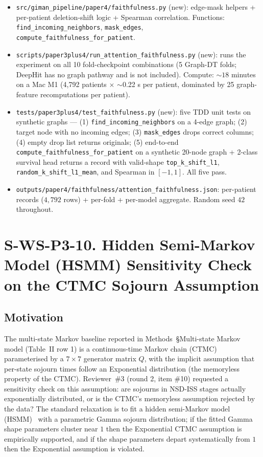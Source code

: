 \documentclass[11pt]{article}
\begin{document}
\begin{itemize}\itemsep=0.2em
  \item \texttt{src/giman\_pipeline/paper4/faithfulness.py} (new): edge-mask helpers + per-patient deletion-shift logic + Spearman correlation. Functions: \texttt{find\_incoming\_neighbors}, \texttt{mask\_edges}, \texttt{compute\_faithfulness\_for\_patient}.
  \item \texttt{scripts/paper3plus4/run\_attention\_faithfulness.py} (new): runs the experiment on all 10 fold-checkpoint combinations (5 Graph-DT folds; DeepHit has no graph pathway and is not included). Compute: $\sim 18$ minutes on a Mac M1 (4{,}792 patients $\times$ $\sim$0.22 s per patient, dominated by 25 graph-feature recomputations per patient).
  \item \texttt{tests/paper3plus4/test\_faithfulness.py} (new): five TDD unit tests on synthetic graphs --- (1) \texttt{find\_incoming\_neighbors} on a 4-edge graph; (2) target node with no incoming edges; (3) \texttt{mask\_edges} drops correct columns; (4) empty drop list returns originals; (5) end-to-end \texttt{compute\_faithfulness\_for\_patient} on a synthetic 20-node graph + 2-class survival head returns a record with valid-shape \texttt{top\_k\_shift\_l1}, \texttt{random\_k\_shift\_l1\_mean}, and Spearman in $[-1, 1]$. All five pass.
  \item \texttt{outputs/paper4/faithfulness/attention\_faithfulness.json}: per-patient records ($4{,}792$ rows) + per-fold + per-model aggregate. Random seed $42$ throughout.
\end{itemize}


\section*{S-WS-P3-10. Hidden Semi-Markov Model (HSMM) Sensitivity Check on the CTMC Sojourn Assumption}

\subsection*{Motivation}

The multi-state Markov baseline reported in Methods~\S Multi-state Markov model (Table~II row 1) is a continuous-time Markov chain (CTMC) parameterised by a $7\times 7$ generator matrix $Q$, with the implicit assumption that per-state sojourn times follow an Exponential distribution (the memoryless property of the CTMC). Reviewer~\#3 (round 2, item \#10) requested a sensitivity check on this assumption: are sojourns in NSD-ISS stages actually exponentially distributed, or is the CTMC's memoryless assumption rejected by the data? The standard relaxation is to fit a hidden semi-Markov model (HSMM)~\cite{yu2010hidden} with a parametric Gamma sojourn distribution; if the fitted Gamma shape parameters cluster near $1$ then the Exponential CTMC assumption is empirically supported, and if the shape parameters depart systematically from $1$ then the Exponential assumption is violated.
\end{document}
